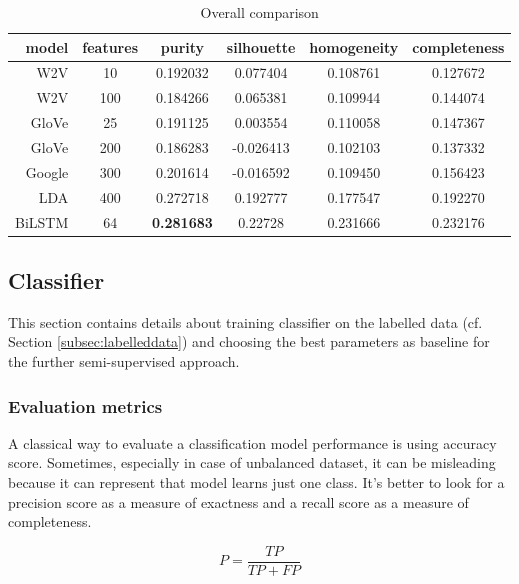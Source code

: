 \documentclass[11pt]{article}
\begin{document}
\begin{table}[htb]
\begin{center}
\begin{tabular}{ |r|c|c|c|c|c| }
\hline
model & features & purity   & silhouette  & homogeneity  & completeness \\ \hline 
W2V 	& 10   	& 0.192032  & 0.077404  & 0.108761  & 0.127672 \\ \hline 
W2V 	& 100  	& 0.184266  & 0.065381  & 0.109944  & 0.144074 \\ \hline 
GloVe	& 25	& 0.191125  & 0.003554  & 0.110058  & 0.147367 \\ \hline
GloVe 	& 200	& 0.186283  & -0.026413 & 0.102103  & 0.137332 \\ \hline
Google  & 300 	& 0.201614  & -0.016592 & 0.109450  & 0.156423 \\ \hline
LDA 	& 400  	& 0.272718  & 0.192777  & 0.177547  & 0.192270 \\ \hline 
BiLSTM 	& 64  	& \textbf{0.281683}  & 0.22728  & 0.231666  & 0.232176\\ \hline 
\end{tabular}
\end{center}
\caption{Overall comparison}
\label{final_comparision}
\end{table}
\FloatBarrier



\subsection{Classifier}
\label{subsec:classifying2}

This section contains details about training classifier on the labelled data (cf. Section \ref{subsec:labelleddata}) and choosing the best parameters as baseline for the further semi-supervised approach.

\subsubsection{Evaluation metrics}

A classical way to evaluate a classification model performance is using accuracy score. Sometimes, especially in case of unbalanced dataset, it can be misleading because it can represent that model learns just one class. It’s better to look for a precision score as a measure of exactness and a recall score as a measure of completeness.

\begin{equation}
P = \frac{TP}{TP+FP} 
\end{equation}
\end{document}
